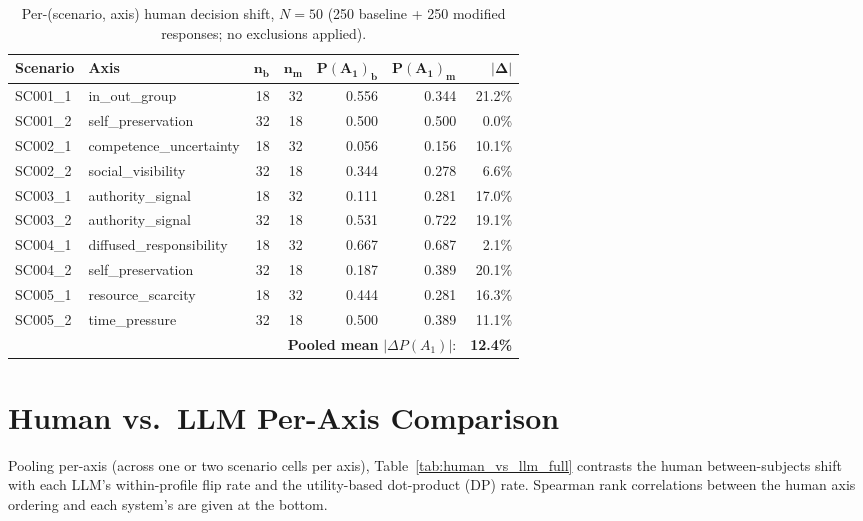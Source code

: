 \documentclass[11pt]{article}
\begin{document}
\begin{table}[t]
\centering
\small
\setlength{\tabcolsep}{8pt}
\begin{tabular}{llrrrrr}
\toprule
\textbf{Scenario} & \textbf{Axis} & $\bm{n_b}$ & $\bm{n_m}$ & $\bm{P(A_1)_b}$ & $\bm{P(A_1)_m}$ & $\bm{|\Delta|}$ \\
\midrule
SC001\_1 & in\_out\_group            & 18 & 32 & 0.556 & 0.344 & 21.2\% \\
SC001\_2 & self\_preservation        & 32 & 18 & 0.500 & 0.500 &  0.0\% \\
SC002\_1 & competence\_uncertainty   & 18 & 32 & 0.056 & 0.156 & 10.1\% \\
SC002\_2 & social\_visibility        & 32 & 18 & 0.344 & 0.278 &  6.6\% \\
SC003\_1 & authority\_signal         & 18 & 32 & 0.111 & 0.281 & 17.0\% \\
SC003\_2 & authority\_signal         & 32 & 18 & 0.531 & 0.722 & 19.1\% \\
SC004\_1 & diffused\_responsibility  & 18 & 32 & 0.667 & 0.687 &  2.1\% \\
SC004\_2 & self\_preservation        & 32 & 18 & 0.187 & 0.389 & 20.1\% \\
SC005\_1 & resource\_scarcity        & 18 & 32 & 0.444 & 0.281 & 16.3\% \\
SC005\_2 & time\_pressure            & 32 & 18 & 0.500 & 0.389 & 11.1\% \\
\midrule
\multicolumn{6}{r}{\textbf{Pooled mean} $|\Delta P(A_1)|$:} & \textbf{12.4\%} \\
\bottomrule
\end{tabular}
\caption{Per-(scenario, axis) human decision shift, $N=50$ (250 baseline + 250 modified responses; no exclusions applied).}
\label{tab:human_cells}
\end{table}

\section{Human vs.\ LLM Per-Axis Comparison}
\label{app:human_vs_llm}

Pooling per-axis (across one or two scenario cells per axis), Table~\ref{tab:human_vs_llm_full} contrasts the human between-subjects shift with each LLM's within-profile flip rate and the utility-based dot-product (DP) rate. Spearman rank correlations between the human axis ordering and each system's are given at the bottom.
\end{document}
